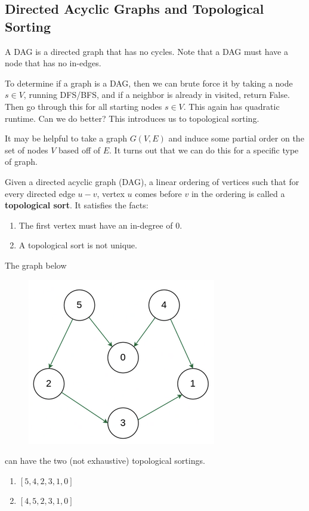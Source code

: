 \documentclass{article}
\begin{document}
    
  \subsection{Directed Acyclic Graphs and Topological Sorting}

    \begin{definition}
      A DAG is a directed graph that has no cycles. Note that a DAG must have a node that has no in-edges. 
    \end{definition}

    To determine if a graph is a DAG, then we can brute force it by taking a node $s \in V$, running DFS/BFS, and if a neighbor is already in visited, return False. Then go through this for all starting nodes $s \in V$. This again has quadratic runtime. Can we do better? This introduces us to topological sorting. 

    It may be helpful to take a graph $G(V, E)$ and induce some partial order on the set of nodes $V$ based off of $E$. It turns out that we can do this for a specific type of graph. 
    
    \begin{definition}
      Given a directed acyclic graph (DAG), a linear ordering of vertices such that for every directed edge $u-v$, vertex $u$ comes before $v$ in the ordering is called a \textbf{topological sort}. It satisfies the facts: 
      \begin{enumerate}
        \item The first vertex must have an in-degree of $0$. 
        \item A topological sort is not unique. 
      \end{enumerate}
    \end{definition}

    \begin{example}
      The graph below 
      \begin{figure}[H]
        \centering 
        \includegraphics[scale=0.55]{img/top_sort.png}
        \caption{} 
        \label{fig:top_sort}
      \end{figure}
      can have the two (not exhaustive) topological sortings. 
      \begin{enumerate}
        \item $[5, 4, 2, 3, 1, 0]$
        \item $[4, 5, 2, 3, 1, 0]$
      \end{enumerate}
    \end{example}
\end{document}
